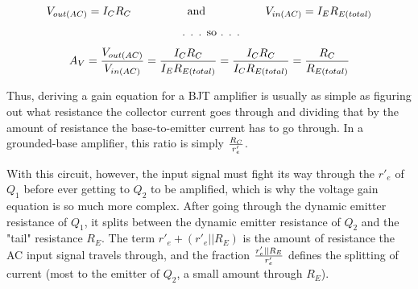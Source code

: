 $$V_{out(AC)} = I_C R_C \hbox{\hskip 50pt and \hskip 50pt} V_{in(AC)} = I_E R_{E(total)}$$

$$\hbox{ . . . so . . .}$$

$$A_V = {V_{out(AC)} \over V_{in(AC)}} = {I_C R_C \over I_E R_{E(total)}} = {I_C R_C \over I_C R_{E(total)}} = {R_C \over R_{E(total)}}$$

Thus, deriving a gain equation for a BJT amplifier is usually as simple as figuring out what resistance the collector current goes through and dividing that by the amount of resistance the base-to-emitter current has to go through.  In a grounded-base amplifier, this ratio is simply $R_C \over r'_e$.

With this circuit, however, the input signal must fight its way through the $r'_e$ of $Q_1$ before ever getting to $Q_2$ to be amplified, which is why the voltage gain equation is so much more complex.  After going through the dynamic emitter resistance of $Q_1$, it splits between the dynamic emitter resistance of $Q_2$ and the "tail" resistance $R_E$.  The term $r'_e + (r'_e || R_E)$ is the amount of resistance the AC input signal travels through, and the fraction ${r'_e || R_E} \over r'_e$ defines the splitting of current (most to the emitter of $Q_2$, a small amount through $R_E$).




